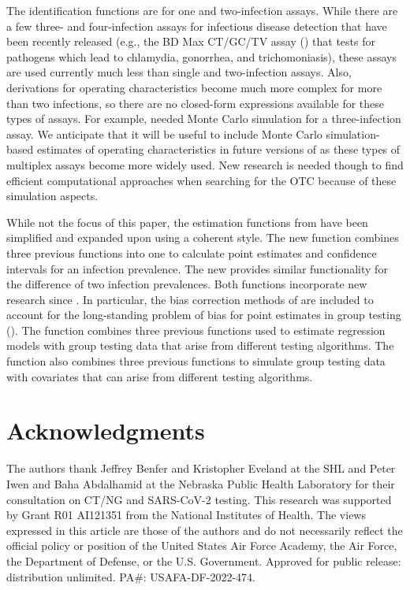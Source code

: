 The identification functions are for one and two-infection assays.
While there are a few three- and four-infection assays for infectious
disease detection that have been recently released (e.g., the BD Max
CT/GC/TV assay (\citealt{BD}) that tests for pathogens which lead
to chlamydia, gonorrhea, and trichomoniasis), these assays are used
currently much less than single and two-infection assays. Also, derivations
for operating characteristics become much more complex for more than
two infections, so there are no closed-form expressions available
for these types of assays. For example, \citet{houarray1} needed
Monte Carlo simulation for a three-infection assay. We anticipate
that it will be useful to include Monte Carlo simulation-based estimates
of operating characteristics in future versions of 
as these types of multiplex assays become more widely used. New research
is needed though to find efficient computational approaches when searching
for the OTC because of these simulation aspects.

While not the focus of this paper, the estimation functions from 
have been simplified and expanded upon using a coherent style. The
new  function combines three previous functions into
one to calculate point estimates and confidence intervals for an infection
prevalence. The new  provides similar functionality
for the difference of two infection prevalences. Both functions incorporate
new research since \citet{Bilder2010b}. In particular, the bias correction
methods of \citet{hepworth2017bias} are included to account for the
long-standing problem of bias for point estimates in group testing
(\citealt{swallow1985group}). The  function combines
three previous  functions used to estimate regression
models with group testing data that arise from different testing algorithms.
The  function also combines three previous 
functions to simulate group testing data with covariates that can
arise from different testing algorithms.

\section{Acknowledgments}

The authors thank Jeffrey Benfer and Kristopher Eveland at the SHL
and Peter Iwen and Baha Abdalhamid at the Nebraska Public Health Laboratory
for their consultation on CT/NG and SARS-CoV-2 testing. This research
was supported by Grant R01 AI121351 from the National Institutes of
Health. The views expressed in this article are those of the authors
and do not necessarily reflect the official policy or position of
the United States Air Force Academy, the Air Force, the Department
of Defense, or the U.S. Government. Approved for public release: distribution
unlimited. PA\#: USAFA-DF-2022-474.

